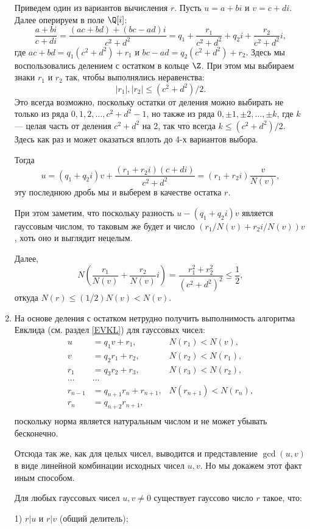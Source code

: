 \begin{enumerate}
Приведем один из вариантов вычисления $r$. Пусть $u=a+bi$ и $v=c+di$. Далее оперируем в поле $\Q[i]$:
$$
\frac{a+bi}{c+di}=\frac{(ac+bd)+(bc-ad)i}{c^2+d^2}=q_1+\frac{r_1}{c^2+d^2}+q_2i+\frac{r_2}{c^2+d^2}i,
$$
где $ac+bd=q_1(c^2+d^2)+r_1$ и $bc-ad=q_2(c^2+d^2)+r_2$. Здесь мы воспользовались делением с остатком в кольце $\Z$. При этом мы выбираем знаки $r_1$ и $r_2$ так, чтобы выполнялись неравенства:
$$
|r_1|,|r_2|\le (c^2+d^2)/2.
$$
Это всегда возможно, поскольку остатки от деления можно выбирать не только из ряда $0,1,2,\dots,c^2+d^2-1$, но также из ряда
$0,\pm 1,\pm 2,\dots,\pm k$, где $k$ --- целая часть от деления $c^2+d^2$ на 2, так что всегда $k\le(c^2+d^2)/2$. Здесь как раз и может оказаться вплоть до 4-х вариантов выбора.

Тогда
$$
u=(q_1+q_2i)v+\frac{(r_1+r_2i)(c+di)}{c^2+d^2}=(r_1+r_2i)\frac{v}{N(v)},
$$
эту последнюю дробь мы и выберем в качестве остатка $r$.

При этом заметим, что поскольку разность $u-(q_1+q_2i)v$ является гауссовым числом, то таковым же будет и число $(r_1/N(v)+r_2i/N(v))v$, хоть оно и выглядит нецелым.

Далее,
$$
N\left(\frac{r_1}{N(v)}+\frac{r_2}{N(v)}i\right)=\frac{r_1^2+r_2^2}{(c^2+d^2)^2}\le \frac 12,
$$
откуда $N(r)\le (1/2)N(v)<N(v)$.

\item На основе деления с остатком нетрудно получить выполнимость алгоритма Евклида (см. раздел \ref{EVKL}) для гауссовых чисел:
\begin{align*}
u & = q_1v + r_1, &  N(r_1)<N(v),\\
v & = q_2r_1 + r_2, &  N(r_2)<N(r_1),\\
r_1 & = q_3r_2 + r_3, &  N(r_3)<N(r_2),\\
\dots & \dots & \\
r_{n-1} & = q_{n+1}r_n + r_{n+1}, &  N(r_{n+1})<N(r_n),\\
r_{n} & = q_{n+2}r_{n+1}, & \\
\end{align*}
поскольку норма является натуральным числом и не может убывать бесконечно.

Отсюда так же, как для целых чисел, выводится и представление $\gcd(u,v)$ в виде линейной комбинации исходных чисел $u,v$. Но мы докажем этот факт иным способом.
\begin{lem}\label{NOD}
Для любых гауссовых чисел $u,v\ne 0$ существует гауссово число $r$ такое, что:

\textup{1)} $r|u$ и $r|v$ (общий делитель);


\end{lem}
\end{enumerate}

